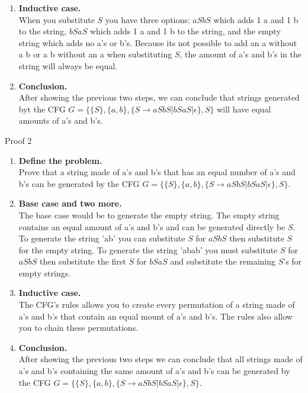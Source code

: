 \documentclass[a4paper]{article}
\begin{document}
\begin{enumerate}
\begin{enumerate}
      \item \textbf{Inductive case.} \\
      When you substitute $S$ you have three options: $aSbS$ which adds 1 a and 1 b to 
      the string, $bSaS$ which adds 1 a and 1 b to the string, and the empty string 
      which adds no a's or b's. Because its not possible to add an a without a b or 
      a b without an a when substituting $S$, the amount of a's and b's in the string 
      will always be equal.

      \item \textbf{Conclusion.} \\
      After showing the previous two steps, we can conclude that strings generated byt the CFG 
      $G = \{ \{S\}, \{a, b\}, \{S \rightarrow aSbS|bSaS|\epsilon \}, S \}$ will have 
      equal amounts of a's and b's.

    \end{enumerate}

    Proof 2
    \begin{enumerate}

      \item \textbf{Define the problem.} \\
      Prove that a string made of a's and b's that has an equal number of a's and b's 
      can be generated by the CFG $G = \{ \{S\}, \{a, b\}, \{S \rightarrow aSbS|bSaS|\epsilon \}, S \}$.

      \item \textbf{Base case and two more.} \\
      The base case would be to generate the empty string. The empty string contains 
      an equal amount of a's and b's and can be generated directly be $S$. To generate
      the string 'ab' you can substitute $S$ for $aSbS$ then substitute $S$ for the
      empty string. To generate the string 'abab' you must substitute $S$ for $aSbS$
      then substitute the first $S$ for $bSaS$ and substitute the remaining $S$'s for 
      empty strings.

      \item \textbf{Inductive case.} \\
      The CFG's rules allows you to create every permutation of a string made of a's and 
      b's that contain an equal mount of a's and b's. The rules also allow you to chain
      these permutations.

      \item \textbf{Conclusion.} \\
      After showing the previous two steps we can conclude that all strings made of
      a's and b's containing the same amount of a's and b's can be generated by the
      CFG $G = \{ \{S\}, \{a, b\}, \{S \rightarrow aSbS|bSaS|\epsilon \}, S \}$.


\end{enumerate}
\end{enumerate}
\end{document}
